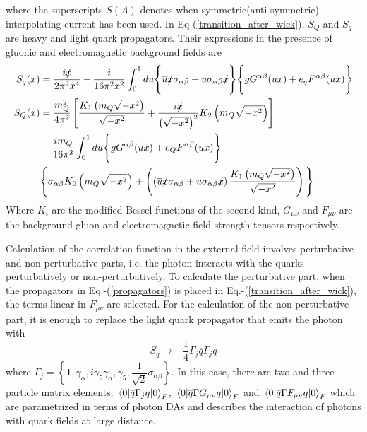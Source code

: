 %
where the superscripts $S(A)$ denotes when symmetric(anti-symmetric) interpolating current has been used. In Eq-(\ref{transition_after_wick}), $S_Q$ and $S_q$ are heavy and light quark propagators. Their expressions in the presence of gluonic and electromagnetic background fields are
%
\begin{equation}
    \begin{aligned}
        S_q(x) &= \dfrac{i\slashed{x}}{2\pi^2x^4}-\dfrac{i}{16\pi^2x^2}\int_0^1du\Bigg\{\overline{u}\slashed{x}\sigma_{\alpha\beta}+u\sigma_{\alpha\beta}\slashed{x}\Bigg\}\Bigg\{gG^{\alpha\beta}(ux)+e_qF^{\alpha\beta}(ux)\Bigg\}\\
        S_Q(x) &= \dfrac{m_Q^2}{4\pi^2}\left[\dfrac{K_1\left(m_Q\sqrt{-x^2}\right)}{\sqrt{-x^2}}+\dfrac{i\slashed{x}}{\left(\sqrt{-x^2}\right)^2}K_2\left(m_Q\sqrt{-x^2}\right)\right]\\
        &-\dfrac{im_Q}{16\pi^2}\int_0^1 du\Bigg\{gG^{\alpha\beta}(ux) + e_QF^{\alpha\beta}(ux)\Bigg\}\\
        &\Bigg\{\sigma_{\alpha\beta}K_0\left(m_Q\sqrt{-x^2}\right) + \left(\left(\overline{u}\slashed{x}\sigma_{\alpha\beta}+u\sigma_{\alpha\beta}\slashed{x}\right)\dfrac{K_1\left(m_Q\sqrt{-x^2}\right)}{\sqrt{-x^2}}\right)\Bigg\}
    \end{aligned}
    \label{propagators}
\end{equation}
Where $K_i$ are the modified Bessel functions of the second kind, $G_{\mu\nu}$ and $F_{\mu\nu}$ are the background gluon and electromagnetic field strength tensors respectively.

Calculation of the correlation function in the external field involves perturbative and non-perturbative parts, i.e. the photon interacts with the quarks perturbatively or non-perturbatively. To calculate the perturbative part, when the propagators in Eq.-(\ref{propagators}) is placed in Eq.-(\ref{transition_after_wick}), the terms linear in $F_{\mu \nu}$ are selected. For the calculation of the non-perturbative part, it is enough to replace the light quark propagator that emits the photon with
\begin{equation}
    S_q \longrightarrow -\dfrac{1}{4}\Gamma_j\overline{q}\Gamma_j q
\end{equation}
where $\Gamma_j = \left\{\mathbf{1},\gamma_\alpha, i\gamma_5\gamma_\alpha, \gamma_5, \dfrac{1}{\sqrt{2}}\sigma_{\alpha\beta}\right\}$. In this case, there are two and three particle matrix elements: $\mel{0}{\overline{q}\Gamma_j q}{0}_F$, $\mel{0}{\overline{q}\Gamma G_{\mu\nu}q}{0}_F$ and $\mel{0}{\overline{q}\Gamma F_{\mu\nu}q}{0}_F$ which are parametrized in terms of photon DAs and describes the interaction of photons with quark fields at large distance.

